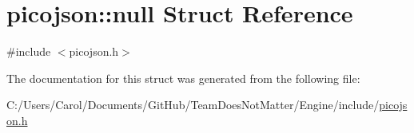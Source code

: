 \hypertarget{structpicojson_1_1null}{}\section{picojson\+:\+:null Struct Reference}
\label{structpicojson_1_1null}


{\ttfamily \#include $<$picojson.\+h$>$}



The documentation for this struct was generated from the following file\+:\begin{DoxyCompactItemize}
\item 
C\+:/\+Users/\+Carol/\+Documents/\+Git\+Hub/\+Team\+Does\+Not\+Matter/\+Engine/include/\hyperlink{picojson_8h}{picojson.\+h}\end{DoxyCompactItemize}
